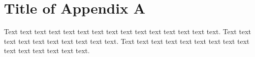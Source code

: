 \chapter{Title of Appendix A}

Text text text text text text text text text text text text text text text. Text text text text text text text text text text.
Text text text text text text text text text text text text text text text.


